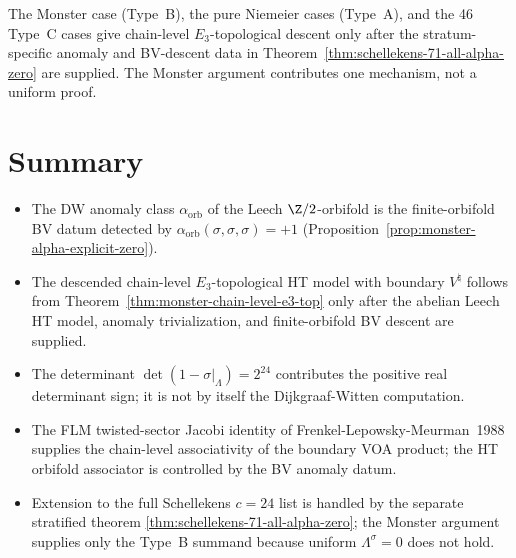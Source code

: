 \begin{remark}
The Monster case (Type~B), the pure Niemeier cases (Type~A), and the
46 Type~C cases give chain-level $E_3$-topological descent only after
the stratum-specific anomaly and BV-descent data in
Theorem~\ref{thm:schellekens-71-all-alpha-zero} are supplied. The
Monster argument contributes one mechanism, not a uniform proof.
\end{remark}

\section{Summary}
\label{sec:monster-chain-level-summary}

\begin{itemize}
\item The DW anomaly class $\alpha_{\mathrm{orb}}$ of the Leech
$\Z/2$-orbifold is the finite-orbifold BV datum detected by
$\alpha_{\mathrm{orb}}(\sigma,\sigma,\sigma)=+1$
(Proposition~\ref{prop:monster-alpha-explicit-zero}).
\item The descended chain-level $E_3$-topological HT model with
boundary $V^\natural$ follows from
Theorem~\ref{thm:monster-chain-level-e3-top} only after the abelian
Leech HT model, anomaly trivialization, and finite-orbifold BV descent
are supplied.
\item The determinant $\det(1-\sigma|_\Lambda)=2^{24}$ contributes
the positive real determinant sign; it is not by itself the
Dijkgraaf-Witten computation.
\item The FLM twisted-sector Jacobi identity of
Frenkel-Lepowsky-Meurman~1988 supplies the chain-level associativity
of the boundary VOA product; the HT orbifold associator is controlled
by the BV anomaly datum.
\item Extension to the full Schellekens $c = 24$ list is handled by
the separate stratified theorem
\ref{thm:schellekens-71-all-alpha-zero}; the Monster argument supplies
only the Type~B summand because uniform $\Lambda^\sigma = 0$ does not
hold.
\end{itemize}

